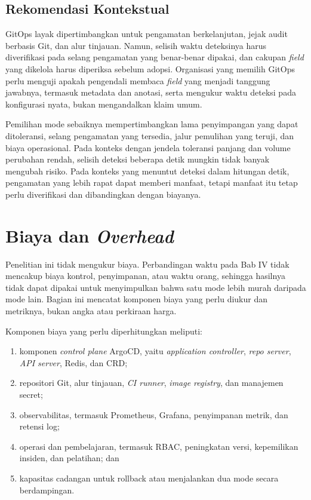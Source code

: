 \subsection{Rekomendasi Kontekstual}
\label{subsec:rekomendasi-kontekstual}

GitOps layak dipertimbangkan untuk pengamatan berkelanjutan, jejak audit berbasis Git, dan alur tinjauan. Namun, selisih waktu deteksinya harus diverifikasi pada selang pengamatan yang benar-benar dipakai, dan cakupan \textit{field} yang dikelola harus diperiksa sebelum adopsi. Organisasi yang memilih GitOps perlu menguji apakah pengendali membaca \textit{field} yang menjadi tanggung jawabnya, termasuk metadata dan anotasi, serta mengukur waktu deteksi pada konfigurasi nyata, bukan mengandalkan klaim umum.

Pemilihan mode sebaiknya mempertimbangkan lama penyimpangan yang dapat ditoleransi, selang pengamatan yang tersedia, jalur pemulihan yang teruji, dan biaya operasional. Pada konteks dengan jendela toleransi panjang dan volume perubahan rendah, selisih deteksi beberapa detik mungkin tidak banyak mengubah risiko. Pada konteks yang menuntut deteksi dalam hitungan detik, pengamatan yang lebih rapat dapat memberi manfaat, tetapi manfaat itu tetap perlu diverifikasi dan dibandingkan dengan biayanya.

\section{Biaya dan \textit{Overhead}}
\label{sec:biaya-overhead}

Penelitian ini tidak mengukur biaya. Perbandingan waktu pada Bab IV tidak mencakup biaya kontrol, penyimpanan, atau waktu orang, sehingga hasilnya tidak dapat dipakai untuk menyimpulkan bahwa satu mode lebih murah daripada mode lain. Bagian ini mencatat komponen biaya yang perlu diukur dan metriknya, bukan angka atau perkiraan harga.

Komponen biaya yang perlu diperhitungkan meliputi:
\begin{enumerate}
  \item komponen \textit{control plane} ArgoCD, yaitu \textit{application controller}, \textit{repo server}, \textit{API server}, Redis, dan CRD;
  \item repositori Git, alur tinjauan, \textit{CI runner}, \textit{image registry}, dan manajemen secret;
  \item observabilitas, termasuk Prometheus, Grafana, penyimpanan metrik, dan retensi log;
  \item operasi dan pembelajaran, termasuk RBAC, peningkatan versi, kepemilikan insiden, dan pelatihan; dan
  \item kapasitas cadangan untuk rollback atau menjalankan dua mode secara berdampingan.
\end{enumerate}

